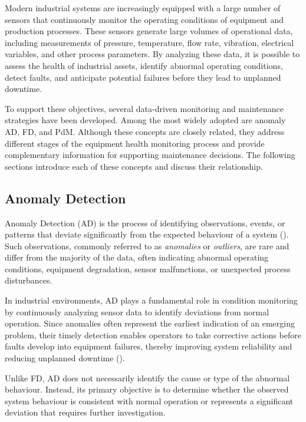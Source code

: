 Modern industrial systems are increasingly equipped with a large number of sensors that continuously monitor the operating conditions of equipment and 
production processes. These sensors generate large volumes of operational data, including measurements of pressure, temperature, flow rate, vibration, 
electrical variables, and other process parameters. By analyzing these data, it is possible to assess the health of industrial assets, identify abnormal operating 
conditions, detect faults, and anticipate potential failures before they lead to unplanned downtime.

To support these objectives, several data-driven monitoring and maintenance strategies have been developed. Among the most widely adopted are anomaly 
AD, FD, and PdM. Although these concepts are closely related, they address different stages of the 
equipment health monitoring process and provide complementary information for supporting maintenance decisions. The following sections introduce each of these 
concepts and discuss their relationship.

\subsection{Anomaly Detection} \label{sec:ad}

Anomaly Detection (AD) is the process of identifying observations, events, or patterns that deviate significantly from the expected behaviour of a 
system (\cite{Chandola2009}). Such observations, commonly referred to as \emph{anomalies} or \emph{outliers}, are rare and differ from the majority of the data, 
often indicating abnormal operating conditions, equipment degradation, sensor malfunctions, or unexpected process disturbances.

In industrial environments, AD plays a fundamental role in condition monitoring by continuously analyzing sensor data to identify deviations 
from normal operation. Since anomalies often represent the earliest indication of an emerging problem, their timely detection enables operators to take corrective 
actions before faults develop into equipment failures, thereby improving system reliability and reducing unplanned downtime (\cite{Darban2025}).

Unlike FD, AD does not necessarily identify the cause or type of the abnormal behaviour. Instead, its primary objective is to determine 
whether the observed system behaviour is consistent with normal operation or represents a significant deviation that requires further investigation.

